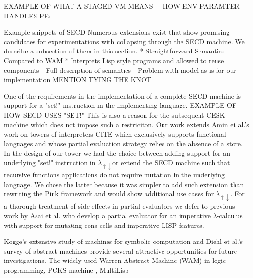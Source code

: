 \documentclass[fleqn]{article}
\theoremstyle{definition}
\newcommand{\mslang}{$\lambda_{\uparrow\downarrow}$}
\begin{document}
EXAMPLE OF WHAT A STAGED VM MEANS + HOW ENV PARAMTER HANDLES PE:

Example snippets of SECD
Numerous extensions exist that show promising candidates for experimentations with collapsing through the SECD machine. We describe a subsection of them in this section.
	* Straightforward Semantics Compared to WAM
	* Interprets Lisp style programs and allowed to reuse components
- Full description of semantics
- Problem with model as is for our implementation
MENTION TYING THE KNOT

One of the requirements in the implementation of a complete SECD machine is support for a "set!" instruction in the implementing language. EXAMPLE OF HOW SECD USES "SET!" This is also a reason for the subsequent CESK machine which does not impose such a restriciton. Our work extends Amin et al.'s work on towers of interpreters CITE which exclusively supports functional languages and whose partial evaluation strategy relies on the absence of a store. In the design of our tower we had the choice between adding support for an underlying "set!" instruction in \mslang or extend the SECD machine such that recursive functions applications do not require mutation in the underlying language. We chose the latter because it was simpler to add such extension than rewriting the Pink framework and would show additional use cases for \mslang. For a thorough treatment of side-effects in partial evaluators we defer to previous work by Asai et al. who develop a partial evaluator for an imperative $\lambda$-calculus with support for mutating cons-cells and imperative LISP features.

Kogge's extensive study of machines for symbolic computation \cite{kogge1990architecture} and Diehl et al.'s survey of abstract machines provide several attractive opportunities for future investigations. The widely used Warren Abstract Machine (WAM) in logic programming, PCKS machine \cite{moreau1994pcks}, MultiLisp

\end{document}
